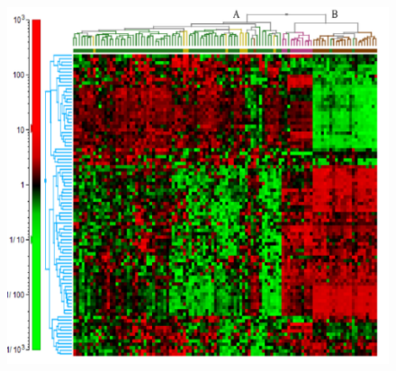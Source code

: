 \begin{itemize}
\begin{figure}[h]
        \includegraphics[width=\textwidth]{assets/mapa_calor.png}
    \end{figure}
\end{itemize}